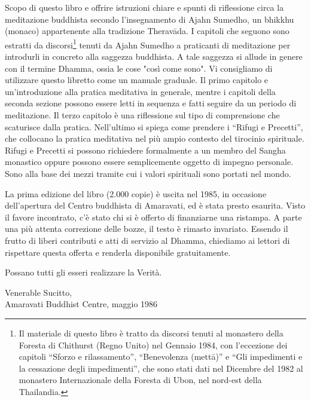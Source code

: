 
Scopo di questo libro e offrire istruzioni chiare e spunti di
riflessione circa la meditazione buddhista secondo l'insegnamento di
Ajahn Sumedho, un bhikkhu (monaco) appartenente alla tradizione
Theravāda. I capitoli che seguono sono estratti da discorsi\footnote{Il materiale di questo libro è tratto da discorsi tenuti
al monastero della Foresta di Chithurst (Regno Unito) nel Gennaio 1984,
con l'eccezione dei capitoli “Sforzo e rilassamento”, “Benevolenza
(mettā)” e “Gli impedimenti e la cessazione degli impedimenti”, che sono
stati dati nel Dicembre del 1982 al monastero Internazionale della
Foresta di Ubon, nel nord-est della Thailandia.}
tenuti da Ajahn Sumedho a praticanti di meditazione per introdurli in
concreto alla saggezza buddhista. A tale saggezza si allude in genere
con il termine Dhamma, ossia le cose "così come sono".
Vi consigliamo di utilizzare questo libretto come un manuale graduale.
Il primo capitolo e un'introduzione alla pratica meditativa in generale,
mentre i capitoli della seconda sezione possono essere letti in sequenza
e fatti seguire da un periodo di meditazione. Il terzo capitolo è una
riflessione sul tipo di comprensione che scaturisce dalla pratica.
Nell'ultimo si spiega come prendere i “Rifugi e Precetti”, che collocano
la pratica meditativa nel più ampio contesto del tirocinio spirituale.
Rifugi e Precetti si possono richiedere formalmente a un membro del
Sangha monastico oppure possono essere semplicemente oggetto di impegno
personale. Sono alla base dei mezzi tramite cui i valori spirituali sono
portati nel mondo.

La prima edizione del libro (2.000 copie) è uscita nel 1985, in
occasione dell'apertura del Centro buddhista di Amaravati, ed è stata
presto esaurita. Visto il favore incontrato, c'è stato chi si è offerto
di finanziarne una ristampa. A parte una più attenta correzione delle
bozze, il testo è rimasto invariato. Essendo il frutto di liberi
contributi e atti di servizio al Dhamma, chiediamo ai lettori di
rispettare questa offerta e renderla disponibile gratuitamente.

Possano tutti gli esseri realizzare la Verità.

\bigskip
{\par\raggedleft
Venerable Sucitto,\\
Amaravati Buddhist Centre, maggio 1986\\
\par}

